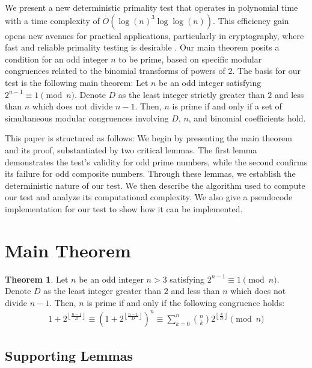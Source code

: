 \documentclass{article}
\theoremstyle{plain}
\theoremstyle{definition}
\newtheorem{theorem}{Theorem}
\begin{document}
We present a new deterministic primality test that operates in polynomial time with a time complexity of $O(\log(n)^3 \log\log(n))$. This efficiency gain opens new avenues for practical applications, particularly in cryptography, where fast and reliable primality testing is desirable \cite{pomerance1984}. Our main theorem posits a condition for an odd integer \( n \) to be prime, based on specific modular congruences related to the binomial transforms of powers of $2$. The basis for our test is the following main theorem: Let \( n \) be an odd integer satisfying \( 2^{n-1} \equiv 1 \pmod{n} \). Denote \( D \) as the least integer strictly greater than \( 2 \) and less than \( n \) which does not divide \( n-1 \). Then, \( n \) is prime if and only if a set of simultaneous modular congruences involving \( D \), \( n \), and binomial coefficients hold.

This paper is structured as follows: We begin by presenting the main theorem and its proof, substantiated by two critical lemmas. The first lemma demonstrates the test's validity for odd prime numbers, while the second confirms its failure for odd composite numbers. Through these lemmas, we establish the deterministic nature of our test. We then describe the algorithm used to compute our test and analyze its computational complexity. We also give a pseudocode implementation for our test to show how it can be implemented.

\section{Main Theorem}

\begin{theorem}
\label{theorem:1}
    Let $n$ be an odd integer $n > 3$ satisfying $2^{n-1} \equiv 1 \pmod{n}$. Denote $D$ as the least integer greater than $2$ and less than $n$ which does not divide $n-1$. Then, $n$ is prime if and only if the following congruence holds:
    \begin{align}
        1 + 2^{\left\lfloor \frac{n-1}{D} \right\rfloor} \equiv \left(1 + 2^{\left\lfloor \frac{n-1}{D} \right\rfloor}\right)^{n} \equiv \sum_{k=0}^{n} \binom{n}{k}2^{\left\lfloor \frac{k}{D} \right\rfloor} \pmod{n}
    \end{align}
\end{theorem}

\subsection{Supporting Lemmas}
\end{document}
